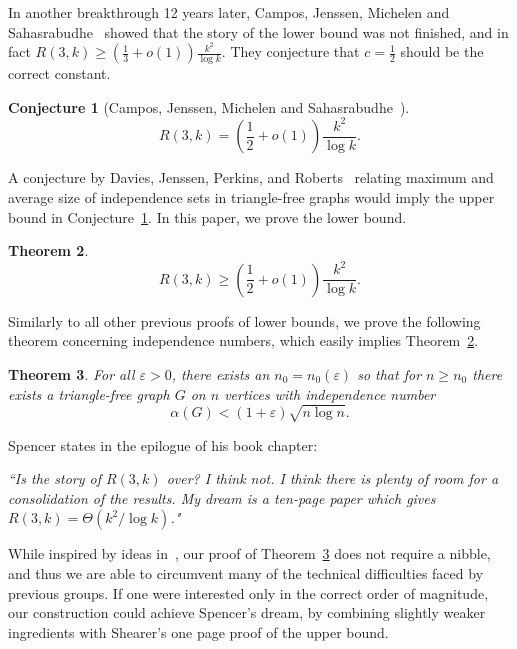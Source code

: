 \documentclass{article}
\newtheorem{theorem}{Theorem}[section]
\newtheorem{conjecture}[theorem]{Conjecture}
\begin{document}
In another breakthrough 12 years later, Campos, Jenssen, Michelen and Sahasrabudhe~\cite{campos2025} showed that the story of the lower bound was not finished, and in fact $R(3,k)\ge \left( \frac13 +o(1)\right)\frac{k^2}{\log{k}}$. They conjecture that $c=\frac12$ should be the correct constant. 
\begin{conjecture}[Campos, Jenssen, Michelen and Sahasrabudhe~\cite{campos2025}]\label{con1/2}
\[R(3,k)=  \left(\frac12+o(1)\right)\frac{k^2}{\log{k}}.\]
\end{conjecture}

A conjecture by Davies, Jenssen, Perkins, and Roberts~\cite{Davies18} relating maximum and average size of independence sets in triangle-free graphs would imply the upper bound in Conjecture~\ref{con1/2}. In this paper, we prove the lower bound. 

\begin{theorem}\label{main2}
    \[
R(3,k)\ge  \left(\frac12+o(1)\right)\frac{k^2}{\log{k}}.
\]
\end{theorem}


Similarly to all other previous proofs of lower bounds, we prove the following theorem concerning independence numbers, which easily implies Theorem~\ref{main2}.

\begin{theorem}\label{main}
    For all $\varepsilon > 0$, there exists an $n_0=n_0(\varepsilon)$ so that for $n \geq n_0$ there exists a triangle-free graph $G$ on $n$ vertices with independence number 
    \[
\alpha(G) < (1+\varepsilon)\sqrt{n \log n}.
\]
\end{theorem}


\noindent Spencer states in the epilogue of his book chapter:

\vspace{0.2cm}
{\em 
``Is the story of $R(3,k)$ over? I think not. I think there is plenty of room for a consolidation of the results. My dream is a ten-page paper which gives $R(3,k)=\Theta(k^2/\log{k})$."
}

\vspace{0.2cm}
While inspired by ideas in~\cite{campos2025}, our proof of Theorem~\ref{main} does not require a nibble, and thus we are able to circumvent many of the technical difficulties faced by previous groups.
If one were interested only in the correct order of magnitude, our construction could achieve Spencer's dream, by combining slightly weaker ingredients with Shearer's one page proof of the upper bound.
\end{document}
